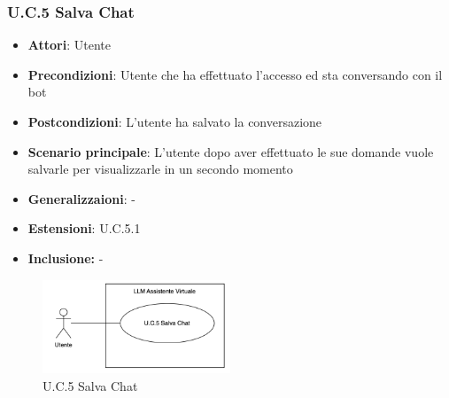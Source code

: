 \subsubsection{U.C.5 Salva Chat}
\begin{itemize}
    \item \textbf{Attori}: Utente
    \item \textbf{Precondizioni}: Utente che ha effettuato l'accesso ed sta conversando con il bot
    \item \textbf{Postcondizioni}: L'utente ha salvato la conversazione
    \item \textbf{Scenario principale}: L'utente dopo aver effettuato le sue domande vuole salvarle per visualizzarle in un secondo momento
    \item \textbf{Generalizzaioni}: -
    \item \textbf{Estensioni}: U.C.5.1
    \item \textbf{Inclusione:} -
\end{itemize}
\begin{figure}[h!]
    \centering
    \includegraphics[width=0.5\textwidth]{img/UC5.png}
    \caption{U.C.5 Salva Chat}
\end{figure}
